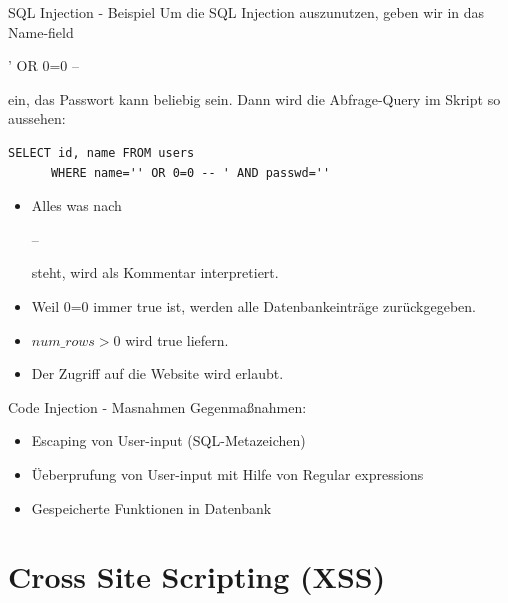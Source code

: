 \documentclass[10pt]{beamer}
\begin{document}
\begin{frame}[fragile]{SQL Injection - Beispiel}
  Um die SQL Injection auszunutzen, geben wir in das Name-field {\fboxsep=0pt\colorbox{mGreen!50}{\strut ' OR 0=0 -- }} ein, das Passwort kann beliebig sein.
  \newline
  Dann wird die Abfrage-Query im Skript so aussehen:
  \newline
  \begin{lstlisting}[style=SQLStyle]
    SELECT id, name FROM users
      WHERE name='' OR 0=0 -- ' AND passwd=''
  \end{lstlisting}
  \begin{itemize}
    \item Alles was nach {\fboxsep=0pt\colorbox{mGreen!50}{\strut -- }} steht, wird als Kommentar interpretiert.
    \item Weil 0=0 immer true ist, werden alle Datenbankeintr\"age zur\"uckgegeben.
    \item $num\_rows>0$ wird true liefern.
    \item Der Zugriff auf die Website wird erlaubt.
  \end{itemize}

\end{frame}

\begin{frame}[fragile]{Code Injection - Masnahmen}
  Gegenmaßnahmen:
  \begin{itemize}
    \item Escaping von User-input (SQL-Metazeichen)
    \item \"Ueberprufung von User-input mit Hilfe von Regular expressions
    \item Gespeicherte Funktionen in Datenbank
  \end{itemize}
\end{frame}


\section{Cross Site Scripting (XSS)}
\end{document}
